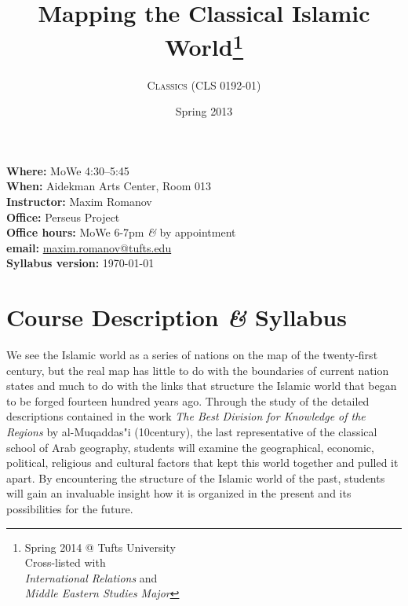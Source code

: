 \documentclass{tufte-handout} %
\title{Mapping the Classical Islamic World\thanks{
Spring 2014 @ Tufts University\\
Cross-listed with\\
\textit{International Relations} and\\
\textit{Middle Eastern Studies Major}
}} %
\author[Maxim G. Romanov]{\textsc{Classics (CLS 0192-01)}} %
\date{Spring 2013}
\def\and{\textit{\&}\xspace}
\begin{document}
\maketitle



\begin{singlespace}
\begin{flushleft}
\textbf{Where: }MoWe 4:30--5:45\\
\textbf{When: }Aidekman Arts Center, Room 013\\
%
\textbf{Instructor: }Maxim Romanov\\
\textbf{Office: }Perseus Project\\
\textbf{Office hours: }MoWe 6-7pm \and by appointment\\
\textbf{email: }\href{maxim.romanov@tufts.edu}{maxim.romanov@tufts.edu}\\

\textbf{Syllabus version: }{\today}

\end{flushleft}
\end{singlespace}

\section{Course Description \and Syllabus}

 We see the Islamic world as a series of nations on the map of the twenty-first century, but the real map has little to do with the boundaries of current nation states and much to do with the links that structure the Islamic world that began to be forged fourteen hundred years ago. Through the study of the detailed descriptions contained in the work \textit{The Best Division for Knowledge of the Regions} by al-Muqaddas"i (10\thh century), the last representative of the classical school of Arab geography, students will examine the geographical, economic, political, religious and cultural factors that kept this world together and pulled it apart. By encountering the structure of the Islamic world of the past, students will gain an invaluable insight how it is organized in the present and its possibilities for the future.
\end{document}
